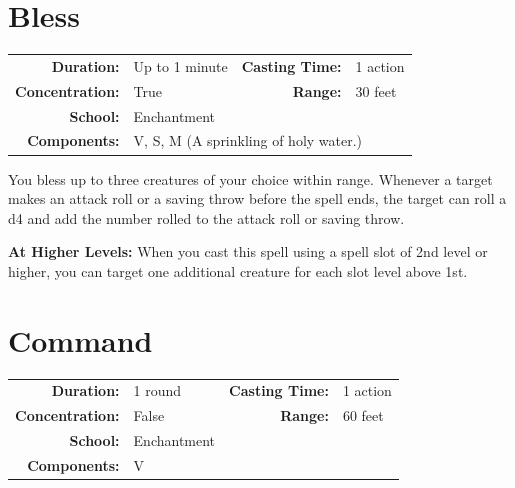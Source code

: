 \documentclass[12pt,showtrims]{memoir}
\begin{document}
\section*{Bless}

{
\small\centering\vspace{-6pt}
\begin{tabular}{rlrl}
\toprule

\textbf{Duration:} & Up to 1 minute &
\textbf{Casting Time:} & 1 action \\
\textbf{Concentration:} & True &
\textbf{Range:} & 30 feet \\
\textbf{School:} & Enchantment \\
\textbf{Components:} & \multicolumn{3}{p{0.7\textwidth}}{V, S, M (A sprinkling of holy water.)}\\

\bottomrule
\end{tabular}
}

\vspace{1\baselineskip}\noindent You bless up to three creatures of your choice within range. Whenever a target makes an attack roll or a saving throw before the spell ends, the target can roll a d4 and add the number rolled to the attack roll or saving throw.

\vspace{8pt} \noindent\textbf{At Higher Levels:} When you cast this spell using a spell slot of 2nd level or higher, you can target one additional creature for each slot level above 1st.
\newpage
\section*{Command}

{
\small\centering\vspace{-6pt}
\begin{tabular}{rlrl}
\toprule

\textbf{Duration:} & 1 round &
\textbf{Casting Time:} & 1 action \\
\textbf{Concentration:} & False &
\textbf{Range:} & 60 feet \\
\textbf{School:} & Enchantment \\
\textbf{Components:} & \multicolumn{3}{p{0.7\textwidth}}{V}\\

\bottomrule
\end{tabular}
}
\end{document}
